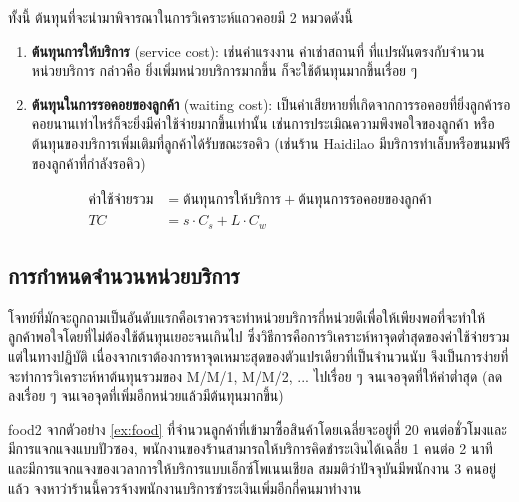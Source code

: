 ทั้งนี้ ต้นทุนที่จะนำมาพิจารณาในการวิเคราะห์แถวคอยมี 2 หมวดดังนี้
\begin{enumerate}
	\item \textbf{ต้นทุนการให้บริการ} (service cost): เช่นค่าแรงงาน ค่าเช่าสถานที่ ที่แปรผันตรงกับจำนวนหน่วยบริการ กล่าวคือ ยิ่งเพิ่มหน่วยบริการมากขึ้น ก็จะใช้ต้นทุนมากขึ้นเรื่อย ๆ
	\item \textbf{ต้นทุนในการรอคอยของลูกค้า} (waiting cost): เป็นค่าเสียหายที่เกิดจากการรอคอยที่ยิ่งลูกค้ารอคอยนานเท่าไหร่ก็จะยิ่งมีค่าใช้จ่ายมากขึ้นเท่านั้น เช่นการประเมิณความพึงพอใจของลูกค้า หรือต้นทุนของบริการเพิ่มเติมที่ลูกค้าได้รับขณะรอคิว (เช่นร้าน Haidilao มีบริการทำเล็บหรือขนมฟรีของลูกค้าที่กำลังรอคิว)
\end{enumerate}
\begin{align*}
	\text{ค่าใช้จ่ายรวม} &= \text{ต้นทุนการให้บริการ} + \text{ต้นทุนการรอคอยของลูกค้า}\\
				TC &= s\cdot C_s + L\cdot C_w 
\end{align*}

\subsection{การกำหนดจำนวนหน่วยบริการ}
โจทย์ที่มักจะถูกถามเป็นอันดับแรกคือเราควรจะทำหน่วยบริการกี่หน่วยดีเพื่อให้เพียงพอที่จะทำให้ลูกค้าพอใจโดยที่ไม่ต้องใช้ต้นทุนเยอะจนเกินไป ซึ่งวิธีการคือการวิเคราะห์หาจุดต่ำสุดของค่าใช้จ่ายรวม
แต่ในทางปฏิบัติ เนื่องจากเราต้องการหาจุดเหมาะสุดของตัวแปรเดียวที่เป็นจำนวนนับ จึงเป็นการง่ายที่จะทำการวิเคราะห์หาต้นทุนรวมของ M/M/1, M/M/2, ... ไปเรื่อย ๆ จนเจอจุดที่ให้ค่าต่ำสุด (ลดลงเรื่อย ๆ จนเจอจุดที่เพิ่มอีกหน่วยแล้วมีต้นทุนมากขึ้น)
\begin{example}
	{}{food2}
	จากตัวอย่าง \ref{ex:food} ที่จำนวนลูกค้าที่เข้ามาซื้อสินค้าโดยเฉลี่ยจะอยู่ที่ 20 คนต่อชั่วโมงและมีการแจกแจงแบบปัวซอง, พนักงานของร้านสามารถให้บริการคิดชำระเงินได้เฉลี่ย 1 คนต่อ 2 นาทีและมีการแจกแจงของเวลาการให้บริการแบบเอ็กซ์โพเนนเชียล สมมติว่าปัจจุบันมีพนักงาน 3 คนอยู่แล้ว จงหาว่าร้านนี้ควรจ้างพนักงานบริการชำระเงินเพิ่มอีกกี่คนมาทำงาน
\end{example}
\newpage

